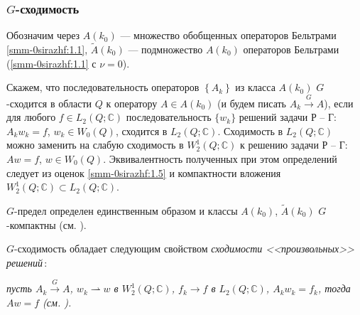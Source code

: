 \subsubsection{$G$-сходимость}
Обозначим через $A(k_0)$ --- множество обобщенных  операторов Бельтрами
\eqref{smm-0sirazhf:1.1}, $\tilde{A}(k_0)$ --- подмножество $A(k_0)$  операторов Бельтрами
(\eqref{smm-0sirazhf:1.1} с $\nu=0$).

\begin{definition}
Скажем, что последовательность операторов $\left\{ \textit{A}_k\right\}$ из класса $A(k_0)$
$G$-сходится в области $Q$ к оператору $A\in A(k_0)$
(и будем писать $A_k\overset{G}{\longrightarrow} A$),
если для любого $f\in L_2(Q;\mathbb{C})$ последовательность $\{w_k\}$ решений задачи Р -- Г: $A_kw_k=f$, $w_k\in W_0(Q)$,
сходится в $L_2(Q;\mathbb{C})$. Сходимость в
$L_2(Q;\mathbb{C})$ можно заменить на слабую сходимость в
$W_2^1(Q;\mathbb{C})$ к решению задачи Р -- Г: $Aw=f$, $w\in W_0(Q)$. Эквивалентность полученных при этом определений следует из оценок \eqref{smm-0sirazhf:1.5} и компактности вложения
$W_2^1(Q;\mathbb{C})\subset L_2(Q;\mathbb{C})$.
\end{definition}

$G$-предел определен единственным образом и
классы $A(k_0)$, $\tilde{A}(k_0)$
$G$-компактны (см. \cite{smm-11}).

$G$-сходимость обладает следующим свойством \textit{сходимости <<произвольных>>  решений\,}:

\noindent\textit{пусть $A_k\overset{G}{\longrightarrow} A$, $w_k\rightharpoonup w$ в $W_2^1(Q;\mathbb{C})$, $f_k\to f$ в $L_2(Q;\mathbb{C})$,
	$A_kw_k=f_k$, тогда $Aw=f$ {(см. \cite{smm-11})}.}


